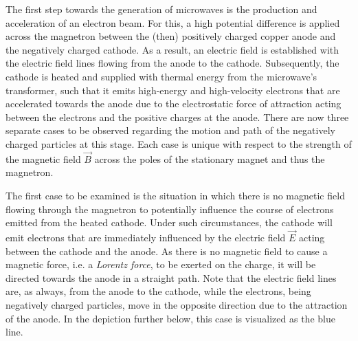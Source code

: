 \begin{figure}[h!]
	\centering

\end{figure}

The first step towards the generation of microwaves is the production and acceleration of an electron beam. For this, a high potential difference is applied across the magnetron between the (then) positively charged copper anode and the negatively charged cathode. As a result, an electric field is established with the electric field lines flowing from the anode to the cathode. Subsequently, the cathode is heated and supplied with thermal energy from the microwave's transformer, such that it emits high-energy and high-velocity electrons that are accelerated towards the anode due to the electrostatic force of attraction acting between the electrons and the positive charges at the anode. There are now three separate cases to be observed regarding the motion and path of the negatively charged particles at this stage. Each case is unique with respect to the strength of the magnetic field $\vec{B}$ across the poles of the stationary magnet and thus the magnetron.


The first case to be examined is the situation in which there is no magnetic field flowing through the magnetron to potentially influence the course of electrons emitted from the heated cathode. Under such circumstances, the cathode will emit electrons that are immediately influenced by the electric field $\vec{E}$ acting between the cathode and the anode. As there is no magnetic field to cause a magnetic force, i.e. a \emph{Lorentz force}, to be exerted on the charge, it will be directed towards the anode in a straight path. Note that the electric field lines are, as always, from the anode to the cathode, while the electrons, being negatively charged particles, move in the opposite direction due to the attraction of the anode. In the depiction further below, this case is visualized as the blue line.

